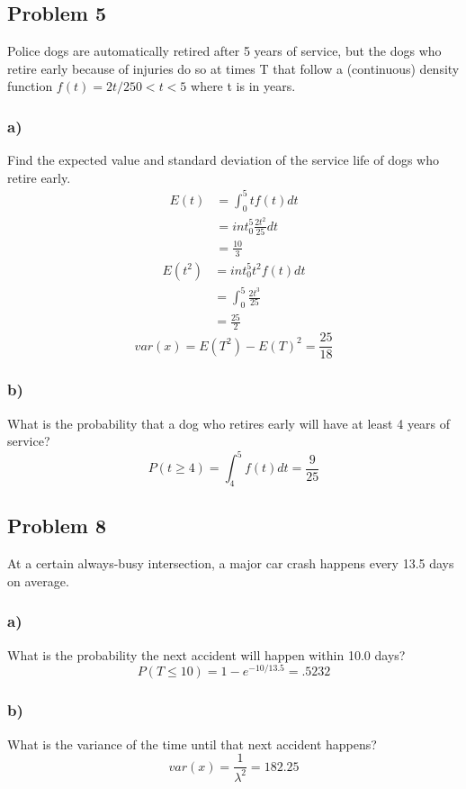 \documentclass{article}
\begin{document}
\subsection*{Problem 5}
Police dogs are automatically retired after 5 years of service, but the dogs who retire early because of injuries do so at times T that follow a (continuous) density function $f(t) = 2t/25 0 < t< 5$ where t is in years.
\subsubsection*{a)}
Find the expected value and standard deviation of the service life of dogs who retire early.
\begin{align}
    E(t) &= \int_0^5tf(t)dt\\
    &=int_0^5\frac{2t^2}{25}dt\\
    &= \boxed{\frac{10}{3}}
\end{align}
\begin{align}
    E(t^2) &= int_0^5 t^2f(t)dt\\
    &= \int_0^5 \frac{2t^3}{25}\\
    &= \boxed{\frac{25}{2}}
\end{align}
\begin{equation}
    var(x) = E(T^2) - E(T)^2 = \boxed{\frac{25}{18}}
\end{equation}
\subsubsection*{b)}
What is the probability that a dog who retires early will have at least 4 years of service?
\begin{equation}
    P(t\geq4) = \int_4^5 f(t) dt = \boxed{\frac{9}{25}}
\end{equation}
\subsection*{Problem 8}
At a certain always-busy intersection, a major car crash happens every 13.5 days on average.
\subsubsection*{a)}
What is the probability the next accident will happen within 10.0 days?
\begin{equation}
    P(T\leq10) = 1-e^{-10/13.5} = \boxed{.5232}
\end{equation}
\subsubsection*{b)}
What is the variance of the time until that next accident happens?
\begin{equation}
    var(x) = \frac{1}{\lambda^2} = \boxed{182.25}
\end{equation}
\end{document}
